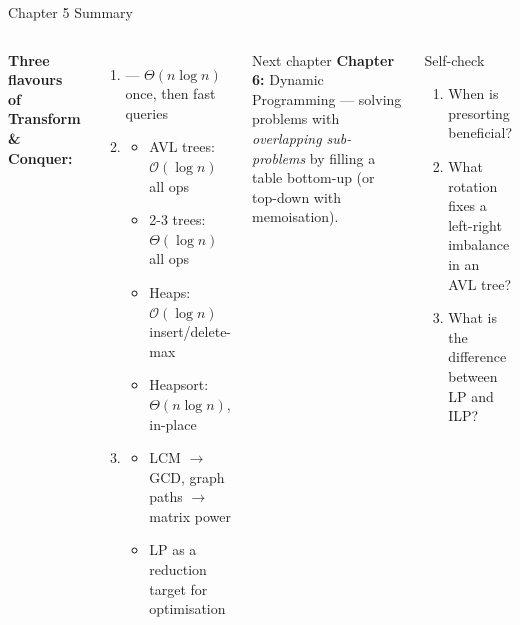 \documentclass[aspectratio=169]{beamer}
\begin{document}
\begin{frame}[shrink=12]{Chapter 5 Summary}
  \begin{columns}[T]
      \textbf{Three flavours of Transform \& Conquer:}
      \begin{enumerate}
        \item {} — $\Theta(n\log n)$ once, then fast queries
        \item {}
          \begin{itemize}
            \item AVL trees: $\mathcal{O}(\log n)$ all ops
            \item 2-3 trees: $\Theta(\log n)$ all ops
            \item Heaps: $\mathcal{O}(\log n)$ insert/delete-max
            \item Heapsort: $\Theta(n\log n)$, in-place
          \end{itemize}
        \item {}
          \begin{itemize}
            \item LCM $\to$ GCD, graph paths $\to$ matrix power
            \item LP as a reduction target for optimisation
          \end{itemize}
      \end{enumerate}
      \begin{block}{Next chapter}
        \textbf{Chapter 6:} Dynamic Programming — solving problems
        with \emph{overlapping sub-problems} by filling a table
        bottom-up (or top-down with memoisation).
      \end{block}
      \vspace{0.3em}
      \begin{exampleblock}{Self-check}
        \begin{enumerate}
          \item When is presorting beneficial?
          \item What rotation fixes a left-right imbalance in an AVL tree?
          \item What is the difference between LP and ILP?
        \end{enumerate}
      \end{exampleblock}
  \end{columns}
\end{frame}
\end{document}

